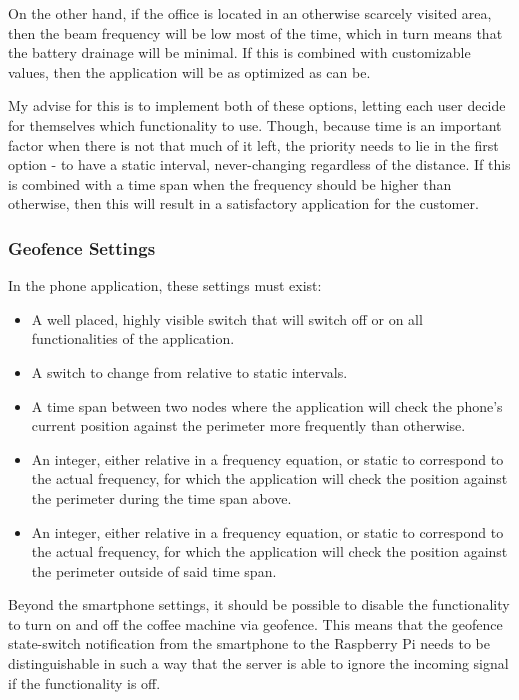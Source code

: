 On the other hand, if the office is located in an otherwise scarcely visited area, then the beam frequency will be low most of the time, which in turn means that the battery drainage will be minimal. If this is combined with customizable values, then the application will be as optimized as can be.

My advise for this is to implement both of these options, letting each user decide for themselves which functionality to use. Though, because time is an important factor when there is not that much of it left, the priority needs to lie in the first option - to have a static interval, never-changing regardless of the distance. If this is combined with a time span when the frequency should be higher than otherwise, then this will result in a satisfactory application for the customer.

\subsubsection{Geofence Settings}

In the phone application, these settings must exist:

\begin{itemize}
\item A well placed, highly visible switch that will switch off or on all functionalities of the application.
\item A switch to change from relative to static intervals.
\item A time span between two nodes where the application will check the phone's current position against the perimeter more frequently than otherwise.
\item An integer, either relative in a frequency equation, or static to correspond to the actual frequency, for which the application will check the position against the perimeter during the time span above.
\item An integer, either relative in a frequency equation, or static to correspond to the actual frequency, for which the application will check the position against the perimeter outside of said time span.
\end{itemize}

Beyond the smartphone settings, it should be possible to disable the functionality to turn on and off the coffee machine via geofence. This means that the geofence state-switch notification from the smartphone to the Raspberry Pi needs to be distinguishable in such a way that the server is able to ignore the incoming signal if the functionality is off.
